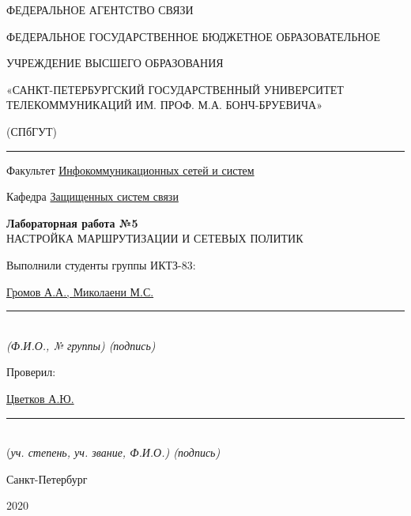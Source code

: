 \documentclass[a4paper,14pt]{extarticle}
\begin{document}
    \begin{center}
        \thispagestyle{empty}
        \begin{singlespace}
        ФЕДЕРАЛЬНОЕ АГЕНТСТВО СВЯЗИ

        ФЕДЕРАЛЬНОЕ ГОСУДАРСТВЕННОЕ БЮДЖЕТНОЕ ОБРАЗОВАТЕЛЬНОЕ

        УЧРЕЖДЕНИЕ ВЫСШЕГО ОБРАЗОВАНИЯ

        «САНКТ-ПЕТЕРБУРГСКИЙ ГОСУДАРСТВЕННЫЙ УНИВЕРСИТЕТ ТЕЛЕКОММУНИКАЦИЙ ИМ. ПРОФ. М.А. БОНЧ-БРУЕВИЧА»

        (СПбГУТ)
        \end{singlespace}
        \vspace{-1ex}
        \rule{\textwidth}{0.4pt}
        \vspace{-5ex}

        Факультет \underline{Инфокоммуникационных сетей и систем}

        Кафедра \underline{Защищенных систем связи}
        \vspace{10ex}

        \textbf{Лабораторная работа №5}\\
        НАСТРОЙКА МАРШРУТИЗАЦИИ И СЕТЕВЫХ ПОЛИТИК


    \end{center}
    \vspace{4ex}
    \begin{flushright}
    \parbox{10 cm}{
    \begin{flushleft}
        Выполнили студенты группы ИКТЗ-83:

        \underline{Громов А.А., Миколаени М.С.} \hfill \rule[-0.85ex]{0.1\textwidth}{0.6pt}\\
        \vspace{-1ex}
        \footnotesize \textit{ (Ф.И.О., № группы) \hfill (подпись)} \normalsize

        Проверил:

        \underline{Цветков А.Ю.} \hfill \rule[-0.85ex]{0.1\textwidth}{0.6pt}\\
        \vspace{-1ex}
        (\footnotesize \textit{уч. степень, уч. звание, Ф.И.О.) \hfill (подпись)} \normalsize

    \end{flushleft}
    }
    \end{flushright}
    \begin{center}
        \vfill
        Санкт-Петербург

        2020

    \end{center}
    \newpage
\end{document}
